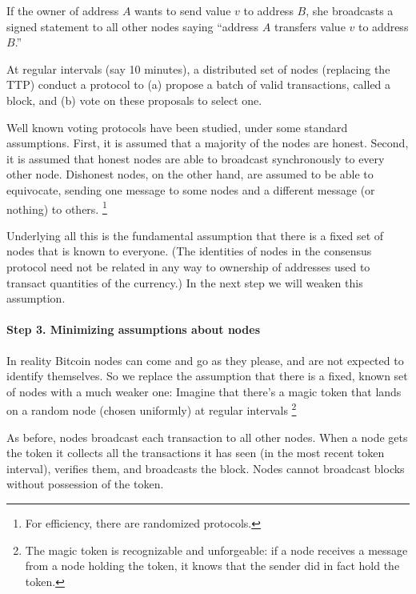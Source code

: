 If the owner of address $A$ wants to send value $v$ to address $B$, she broadcasts a signed statement to all other nodes saying ``address $A$ transfers value $v$ to address $B$.''

At regular intervals (say 10 minutes), a distributed set of nodes (replacing the TTP) conduct a protocol to (a) propose a batch of valid transactions, called a block, and (b) vote on these proposals to select one. 

Well known voting protocols have been studied, under some standard assumptions. First, it is assumed that a majority of the nodes are honest. Second, it is assumed that honest nodes are able to broadcast synchronously to every other node. Dishonest nodes, on the other hand, are assumed to be able to equivocate, sending one message to some nodes and a different message (or nothing) to others. \footnote{For efficiency, there are randomized protocols.}

Underlying all this is the fundamental assumption that there is a fixed set of nodes that is known to everyone. (The identities of nodes in the consensus protocol need not be related in any way to ownership of addresses used to transact quantities of the currency.) In the next step we will weaken this assumption. 

\paragraph{Step 3. Minimizing assumptions about nodes}

In reality Bitcoin nodes can come and go as they please, and are not expected to identify themselves. So we replace the assumption that there is a fixed, known set of nodes with a much weaker one: Imagine that there’s a magic token that lands on a random node (chosen uniformly) at regular intervals \footnote{The magic token is recognizable and unforgeable: if a node receives a message from a node holding the token, it knows that the sender did in fact hold the token.}

As before, nodes broadcast each transaction to all other nodes. When a node gets the token it collects all the transactions it has seen (in the most recent token interval), verifies them, and broadcasts the block. Nodes cannot broadcast blocks without possession of the token.



